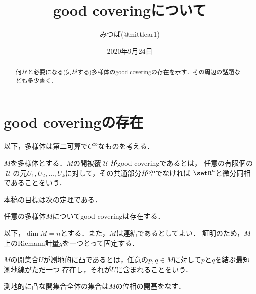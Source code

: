 \documentclass[uplatex]{jsarticle}
\title{good coveringについて}
\author{みつば(@mittlear1)}
\date{2020年9月24日}
\begin{document}
\maketitle
\begin{abstract}
    何かと必要になる(気がする)多様体のgood coveringの存在を示す．その周辺の話題なども多少書く．
\end{abstract}

\section{good coveringの存在}
以下，多様体は第二可算で$C^\infty$なものを考える．


\begin{definition}
  $M$を多様体とする．$M$の開被覆$\mscrU$がgood coveringであるとは，
  任意の有限個の$\mscrU$の元$U_1,U_2,\dots,U_k$に対して，その共通部分が空でなければ
  $\setR^n$と微分同相であることをいう．
\end{definition}

本稿の目標は次の定理である．

\begin{theorem}\label{main}
  任意の多様体$M$についてgood coveringは存在する．
\end{theorem}

以下，$\dim M = n$とする．また，$M$は連結であるとしてよい．
証明のため，$M$上のRiemann計量$g$を一つとって固定する．

\begin{definition}
  $M$の開集合$U$が測地的に凸であるとは，任意の$p, q \in M$に対して$p$と$q$を結ぶ最短測地線がただ一つ
  存在し，それが$U$に含まれることをいう．
\end{definition}

\begin{proposition}\label{existence}
  測地的に凸な開集合全体の集合は$M$の位相の開基をなす．
\end{proposition}
\end{document}
